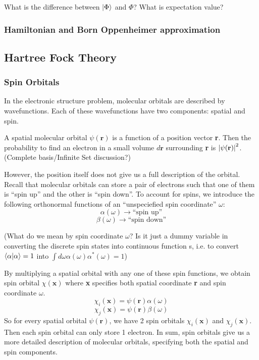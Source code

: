 \documentclass{article}
\begin{document}
  What is the difference between \(\ket{\Phi}\) and \(\Phi\)?
  What is expectation value?
    \subsubsection{Hamiltonian and Born Oppenheimer approximation}
  \subsection{Hartree Fock Theory}
    \subsubsection{Spin Orbitals}
      In the electronic structure problem, molecular orbitals are described
      by wavefunctions. Each of these wavefunctions have two components: spatial
      and spin.

        A spatial molecular orbital \(\psi(\mathbf{r})\) is a function of
        a position vector \textbf{r}. Then the probability to find an
        electron in a small volume \(d\mathbf{r}\) surrounding \textbf{r} is
        \(\abs{\psi(\mathbf{r})}^2\). (Complete basis/Infinite Set discussion?)

        However, the position itself does not give us a full description of
        the orbital. Recall that molecular orbitals can store a pair of electrons
        such that one of them is ``spin up'' and the other is ``spin down''. To
        account for spins, we introduce the following orthonormal functions of
        an ``unspeciefied spin coordinate'' \(\omega\):
        \[\alpha(\omega) \xrightarrow{} \textrm{``spin up''}\]
        \[\beta(\omega) \xrightarrow{} \textrm{``spin down''}\]

        (What do we mean by spin coordinate \(\omega\)? Is it just a dummy
        variable in converting the discrete spin states into continuous function
        s, i.e. to convert  \(\bra{\alpha}\ket{\alpha} = 1\) into
        \(\int d\omega  \alpha(\omega)\alpha^* (\omega) = 1\))

        By multiplying a spatial orbital with any one of these spin functions, we
        obtain spin orbital \(\chi(\mathbf{x})\) where \textbf{x} specifies both spatial
        coordinate \textbf{r} and spin coordinate \(\omega\).
        \[\chi_i (\mathbf{x}) = \psi(\mathbf{r})\alpha(\omega) \]
        \[\chi_j (\mathbf{x}) = \psi(\mathbf{r})\beta(\omega)\]
        So for every spatial orbital \(\psi(\mathbf{r})\), we have 2 spin
        orbitals \(\chi_i (\mathbf{x})\) and \(\chi_j (\mathbf{x})\). Then each
        spin orbital can only store 1 electron. In sum, spin orbitals give
        us a more detailed description of molecular orbitals, specifying both
        the spatial and spin components.
\end{document}
